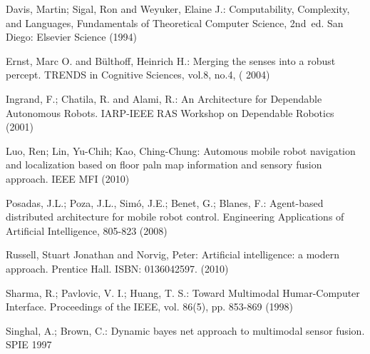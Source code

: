 \documentclass{svmult}
\begin{document}
\begin{thebibliography}{0}



Davis, Martin; Sigal, Ron and Weyuker, Elaine J.:
Computability, Complexity, and Languages, Fundamentals of Theoretical Computer Science, 2nd~ed.
San Diego: Elsevier Science (1994)


Ernst, Marc O. and B\"{u}lthoff, Heinrich H.:
Merging the senses into a robust percept.
TRENDS in Cognitive Sciences, vol.8, no.4, ( 2004)


Ingrand, F.; Chatila, R.  and Alami, R.:
An Architecture for Dependable Autonomous Robots. 
IARP-IEEE RAS Workshop on Dependable Robotics (2001)

Luo, Ren; Lin, Yu-Chih; Kao, Ching-Chung:
Automous mobile robot navigation and localization based on floor paln map information and sensory fusion approach. 
IEEE MFI (2010)

Posadas, J.L.; Poza, J.L., Sim\'{o}, J.E.; Benet, G.; Blanes, F.:
Agent-based distributed architecture for mobile robot control. 
Engineering Applications of Artificial Intelligence, 805-823 (2008) 



Russell, Stuart Jonathan and Norvig, Peter:
Artificial intelligence: a modern approach.
Prentice Hall. ISBN: 0136042597. (2010)


Sharma, R.; Pavlovic, V. I.; Huang, T. S.:
Toward Multimodal Humar-Computer Interface.
Proceedings of the IEEE, vol. 86(5), pp. 853-869 (1998)

Singhal, A.; Brown, C.:
Dynamic bayes net approach to multimodal sensor fusion. 
SPIE 1997





\end{thebibliography}
\end{document}
